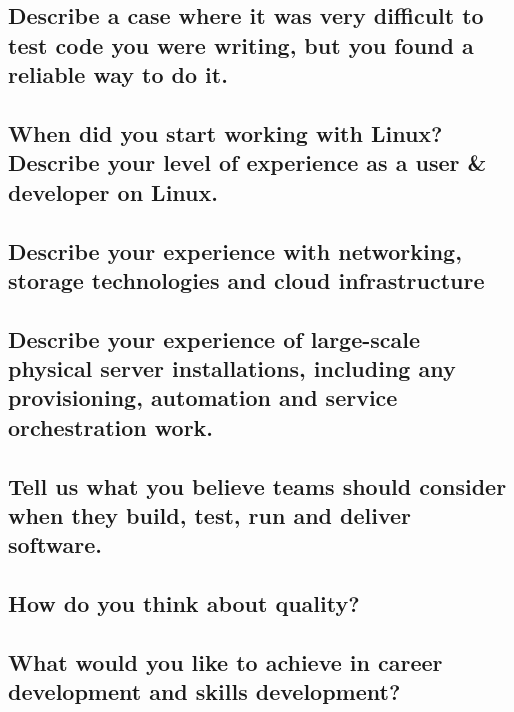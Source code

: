\documentclass{article}
\begin{document}
\subsection{Describe a case where it was very difficult to test code you were writing, but you found a reliable way to do it.}
\subsection{When did you start working with Linux? Describe your level of experience as a user \& developer on Linux.}
\subsection{Describe your experience with networking, storage technologies and cloud infrastructure}
\subsection{Describe your experience of large-scale physical server installations, including any provisioning, automation and service orchestration work.}
\subsection{Tell us what you believe teams should consider when they build, test, run and deliver software.}
\subsection{How do you think about quality?}
\subsection{What would you like to achieve in career development and skills development?}
\end{document}
